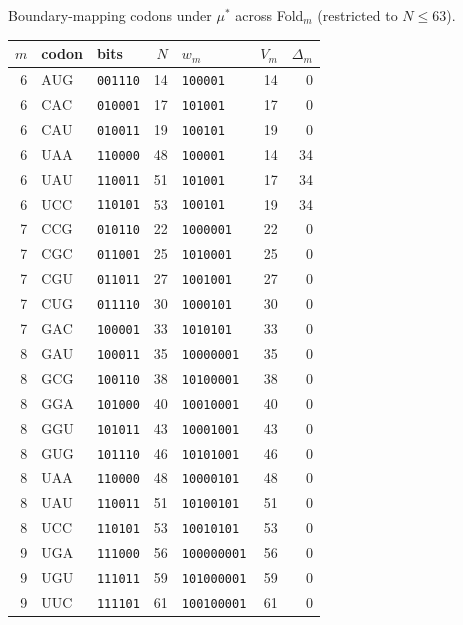 Boundary-mapping codons under $\mu^\ast$ across Fold$_m$ (restricted to $N\le 63$).

\begin{center}
\small
\setlength{\tabcolsep}{6pt}
\renewcommand{\arraystretch}{1.15}
\begin{tabular}{r l l r l r r}
\toprule
$m$ & codon & bits & $N$ & $w_m$ & $V_m$ & $\Delta_m$ \\
\midrule
6 & $\mathrm{AUG}$ & \texttt{001110} & 14 & \texttt{100001} & 14 & 0 \\
6 & $\mathrm{CAC}$ & \texttt{010001} & 17 & \texttt{101001} & 17 & 0 \\
6 & $\mathrm{CAU}$ & \texttt{010011} & 19 & \texttt{100101} & 19 & 0 \\
6 & $\mathrm{UAA}$ & \texttt{110000} & 48 & \texttt{100001} & 14 & 34 \\
6 & $\mathrm{UAU}$ & \texttt{110011} & 51 & \texttt{101001} & 17 & 34 \\
6 & $\mathrm{UCC}$ & \texttt{110101} & 53 & \texttt{100101} & 19 & 34 \\
7 & $\mathrm{CCG}$ & \texttt{010110} & 22 & \texttt{1000001} & 22 & 0 \\
7 & $\mathrm{CGC}$ & \texttt{011001} & 25 & \texttt{1010001} & 25 & 0 \\
7 & $\mathrm{CGU}$ & \texttt{011011} & 27 & \texttt{1001001} & 27 & 0 \\
7 & $\mathrm{CUG}$ & \texttt{011110} & 30 & \texttt{1000101} & 30 & 0 \\
7 & $\mathrm{GAC}$ & \texttt{100001} & 33 & \texttt{1010101} & 33 & 0 \\
8 & $\mathrm{GAU}$ & \texttt{100011} & 35 & \texttt{10000001} & 35 & 0 \\
8 & $\mathrm{GCG}$ & \texttt{100110} & 38 & \texttt{10100001} & 38 & 0 \\
8 & $\mathrm{GGA}$ & \texttt{101000} & 40 & \texttt{10010001} & 40 & 0 \\
8 & $\mathrm{GGU}$ & \texttt{101011} & 43 & \texttt{10001001} & 43 & 0 \\
8 & $\mathrm{GUG}$ & \texttt{101110} & 46 & \texttt{10101001} & 46 & 0 \\
8 & $\mathrm{UAA}$ & \texttt{110000} & 48 & \texttt{10000101} & 48 & 0 \\
8 & $\mathrm{UAU}$ & \texttt{110011} & 51 & \texttt{10100101} & 51 & 0 \\
8 & $\mathrm{UCC}$ & \texttt{110101} & 53 & \texttt{10010101} & 53 & 0 \\
9 & $\mathrm{UGA}$ & \texttt{111000} & 56 & \texttt{100000001} & 56 & 0 \\
9 & $\mathrm{UGU}$ & \texttt{111011} & 59 & \texttt{101000001} & 59 & 0 \\
9 & $\mathrm{UUC}$ & \texttt{111101} & 61 & \texttt{100100001} & 61 & 0 \\
\bottomrule
\end{tabular}
\end{center}

